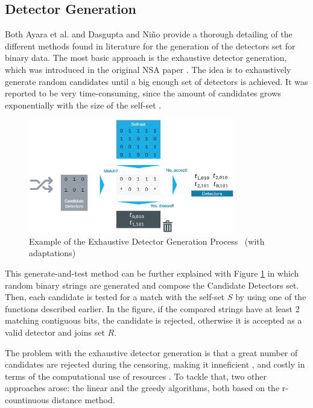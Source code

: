 \subsection{Detector Generation} \label{sec:bgNSADetectors}


Both Ayara et al. \cite{NSADetectorGen2002} and Dasgupta and Niño \cite{ICBook2009} provide a thorough detailing of the different methods found in literature for the generation of the detectors set for binary data. The most basic approach is the exhaustive detector generation, which was introduced in the original NSA paper \cite{Forrest1994}. The idea is to exhaustively generate random candidates until a big enough set of detectors is achieved. It was reported to be very time-consuming, since the amount of candidates grows exponentially with the size of the self-set \cite{LinearNSA1996}.

\begin{figure}[!h]
	\centering
	\includegraphics[width=0.8\textwidth, keepaspectratio]{img/exhaustiveNSA.png}
	\caption{Example of the Exhaustive Detector Generation Process~ \cite{LinearNSA1996} (with adaptations)}
	\label{fig:ExhDet}
\end{figure}

This generate-and-test method can be further explained with Figure \ref{fig:ExhDet} in which random binary strings are generated and compose the Candidate Detectors set. Then, each candidate is tested for a match with the self-set \(S\) by using one of the functions described earlier. In the figure, if the compared strings have at least 2 matching contiguous bits, the candidate is rejected, otherwise it is accepted as a valid detector and joins set \(R\).

The problem with the exhaustive detector generation is that a great number of candidates are rejected during the censoring, making it inneficient \cite{NSADetGen1996}, and costly in terms of the computational use of resources \cite{NSADetectorGen2002}. To tackle that, two other approaches arose: the linear and the greedy algorithms, both based on the r-countinuous distance method. 

